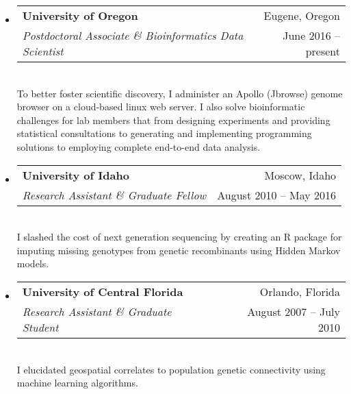 \documentclass[11pt,letterpaper,sans]{moderncv}        %
\begin{document}
\begin{itemize}

\item{
\centering
  \begin{tabular}{p{15cm}r}
\textbf{University of Oregon} & Eugene, Oregon\\
\textit{Postdoctoral Associate \& Bioinformatics Data Scientist} & June 2016 -- present \\
  \end{tabular}
}
\\
To better foster scientific discovery, I administer an Apollo (Jbrowse) genome browser on a cloud-based linux web server. I also solve bioinformatic challenges for lab members that from designing experiments and providing statistical consultations to generating and implementing programming solutions to employing complete end-to-end data analysis.
\vspace{4pt}

\item{
\centering
  \begin{tabular}{p{14.2cm}r}
\textbf{University of Idaho} & Moscow, Idaho\\
\textit{Research Assistant \& Graduate Fellow} & August 2010 -- May 2016 \\
  \end{tabular}
}
\\
I slashed the cost of next generation sequencing by creating an R package for imputing missing genotypes from genetic recombinants using Hidden Markov models. 
\vspace{4pt}

\item{
\centering
  \begin{tabular}{p{14.2cm}r}
\textbf{University of Central Florida} & Orlando, Florida \\
\textit{Research Assistant \& Graduate Student} & August 2007 -- July 2010 \\
  \end{tabular}
}
\\
I elucidated geospatial correlates to population genetic connectivity using machine learning algorithms. 

\end{itemize}
\end{document}
